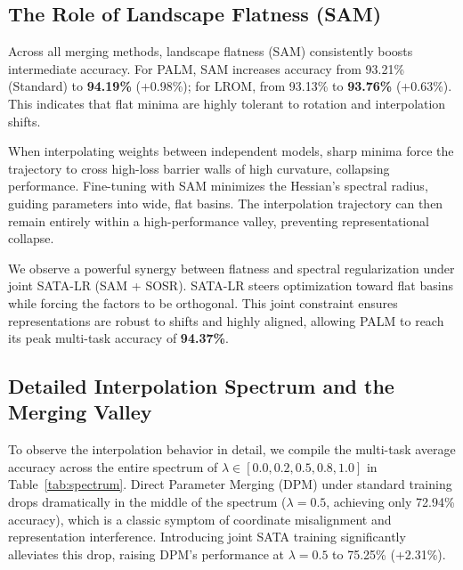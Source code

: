 \documentclass{article}
\theoremstyle{plain}
\theoremstyle{definition}
\theoremstyle{remark}
\begin{document}
\subsection{The Role of Landscape Flatness (SAM)}
Across all merging methods, landscape flatness (SAM) consistently boosts intermediate accuracy. For PALM, SAM increases accuracy from 93.21\% (Standard) to \textbf{94.19\%} (+0.98\%); for LROM, from 93.13\% to \textbf{93.76\%} (+0.63\%). This indicates that flat minima are highly tolerant to rotation and interpolation shifts.

When interpolating weights between independent models, sharp minima force the trajectory to cross high-loss barrier walls of high curvature, collapsing performance. Fine-tuning with SAM minimizes the Hessian's spectral radius, guiding parameters into wide, flat basins. The interpolation trajectory can then remain entirely within a high-performance valley, preventing representational collapse.

We observe a powerful synergy between flatness and spectral regularization under joint SATA-LR (SAM + SOSR). SATA-LR steers optimization toward flat basins while forcing the factors to be orthogonal. This joint constraint ensures representations are robust to shifts and highly aligned, allowing PALM to reach its peak multi-task accuracy of \textbf{94.37\%}.

\subsection{Detailed Interpolation Spectrum and the Merging Valley}
To observe the interpolation behavior in detail, we compile the multi-task average accuracy across the entire spectrum of $\lambda \in [0.0, 0.2, 0.5, 0.8, 1.0]$ in Table~\ref{tab:spectrum}. Direct Parameter Merging (DPM) under standard training drops dramatically in the middle of the spectrum ($\lambda = 0.5$, achieving only 72.94\% accuracy), which is a classic symptom of coordinate misalignment and representation interference. Introducing joint SATA training significantly alleviates this drop, raising DPM's performance at $\lambda = 0.5$ to 75.25\% (+2.31\%).
\end{document}
